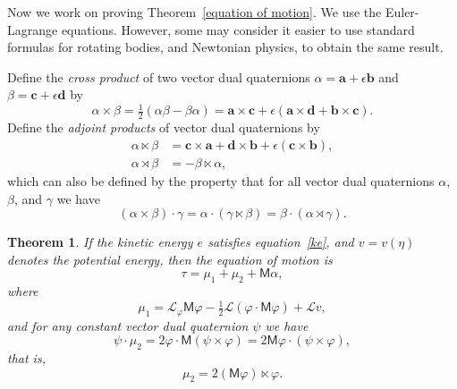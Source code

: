 \documentclass[reqno,12pt]{amsart}
\newcommand{\liederiv}{\mathcal L}
\newtheorem{theorem}{Theorem}
\begin{document}
\bigskip

Now we work on proving Theorem~\ref{equation of motion}.  We use the Euler-Lagrange equations.  However, some may consider it easier to use standard formulas for rotating bodies, and Newtonian physics, to obtain the same result.

Define the \emph{cross product} of two vector dual quaternions $\alpha = \bm a + \epsilon \bm b$ and $\beta = \bm c + \epsilon \bm d$ by
\begin{equation}
\alpha \times \beta = \tfrac12(\alpha \beta - \beta \alpha) = \bm a \times \bm c + \epsilon (\bm a \times \bm d + \bm b \times \bm c) .
\end{equation}
Define the \emph{adjoint products} of vector dual quaternions by
\begin{align}
\label{ltimes}
\alpha \ltimes \beta &= \bm c \times \bm a + \bm d \times \bm b + \epsilon (\bm c \times \bm b) ,\\
\alpha \rtimes \beta &= - \beta \ltimes \alpha ,
\end{align}
which can also be defined by the property that for all vector dual quaternions $\alpha$, $\beta$, and $\gamma$ we have
\begin{equation}
(\alpha \times \beta) \cdot \gamma = \alpha \cdot (\gamma \ltimes \beta) = \beta \cdot (\alpha \rtimes \gamma ).
\end{equation}


\begin{theorem}
\label{euler-lagrange}
If the kinetic energy $e$ satisfies equation~\eqref{ke}, and $v = v(\eta)$ denotes the potential energy, then the equation of motion is
\begin{equation}
\label{tau M gamma}
\tau = \mu_1 + \mu_2 + \mathsf M \alpha,
\end{equation}
where
\begin{equation}
\mu_1 = \liederiv_\varphi \mathsf M \varphi - \tfrac12 \liederiv(\varphi \cdot \mathsf M \varphi) + \liederiv v, 
\end{equation}
and for any constant vector dual quaternion $\psi$ we have
\begin{equation}
\psi \cdot \mu_2 = 2 \varphi \cdot \mathsf M (\psi \times \varphi) = 2 \mathsf M \varphi \cdot (\psi \times \varphi),
\end{equation}
that is,
\begin{equation}
\label{formula mu_2}
\mu_2 = 2 (\mathsf M \varphi) \ltimes \varphi .
\end{equation}
\end{theorem}
\end{document}
